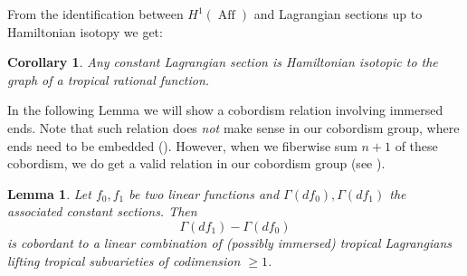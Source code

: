 \documentclass[10pt]{amsart}
\newtheorem{lem}[thm]{Lemma}
\newtheorem{cor}[thm]{Corollary}
\theoremstyle{definition}
\theoremstyle{remark}
\DeclareMathOperator{\Aff}{Aff}
\begin{document}
From the identification between $H^1(\Aff)$ and Lagrangian sections up to Hamiltonian isotopy we get: 
\begin{cor}\label{cor:constantsectionistropical}
    Any constant Lagrangian section is Hamiltonian isotopic to the graph of a tropical rational function.
\end{cor}

In the following Lemma we will show a cobordism relation involving immersed ends.
Note that such relation does \emph{not} make sense in our cobordism group, where ends need to be embedded ().
However, when we fiberwise sum $n+1$ of these cobordism, we do get a valid relation in our cobordism group (see ).

\begin{lem}\label{cor:difference_of_flat_sections_codimension}
    Let $f_0,f_1$ be two linear functions and $\Gamma(df_0),\Gamma(df_1)$ the associated constant sections.
    Then 
    $$
    \Gamma(df_1) - \Gamma(df_0) 
    $$
    is cobordant to a linear combination of (possibly immersed) tropical Lagrangians lifting tropical subvarieties of codimension $\geq 1$.
\end{lem}
\end{document}
